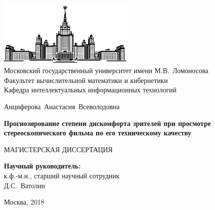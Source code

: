 \documentclass[14pt, a4paper]{extarticle}
\begin{document}
\thispagestyle{empty}

\begin{center}
\ \vspace{-3cm}

\includegraphics[width=0.5\textwidth]{img/msu.eps}\\
{Московский государственный университет имени М.В.~Ломоносова}\\
Факультет вычислительной математики и кибернетики\\
Кафедра интеллектуальных информационных технологий

\vspace{5cm}

{\Large Анциферова~Анастасия~Всеволодовна}

\vspace{1cm}

{\Large\bfseries
Прогнозирование степени дискомфорта зрителей при просмотре стереоскопического фильма по его техническому качеству\\}

\vspace{1cm}

{\large МАГИСТЕРСКАЯ ДИССЕРТАЦИЯ}
\end{center}

\vfill

\begin{flushright}
  \textbf{Научный руководитель:}\\
  к.ф.-м.н., старший научный сотрудник\\
  Д.С.~Ватолин
\end{flushright}

\vfill

\begin{center}
Москва, 2018
\end{center}

\enlargethispage{4\baselineskip}
\end{document}
